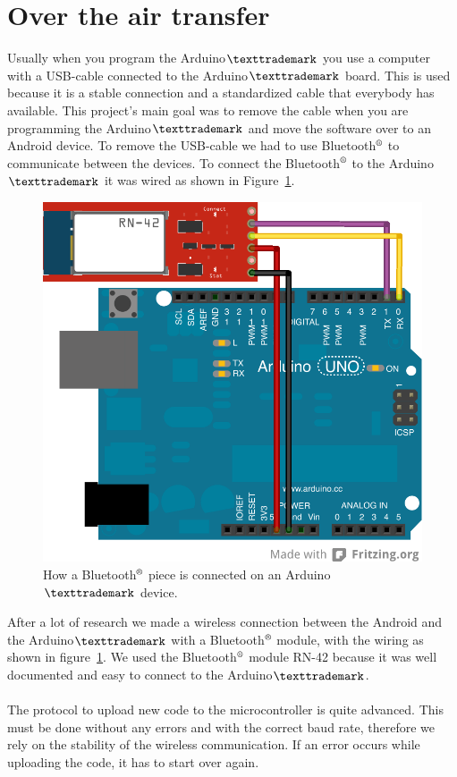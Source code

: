\section{Over the air transfer}
Usually when you program the Arduino$\texttrademark$ you use a computer with a USB-cable connected to the Arduino$\texttrademark$ board. This is used because it is a stable connection and a standardized cable that everybody has available. This project's main goal was to remove the cable when you are programming the Arduino$\texttrademark$ and move the software over to an Android device. To remove the USB-cable we had to use Bluetooth$\textsuperscript{\textregistered}$ to communicate between the devices. To connect the Bluetooth$\textsuperscript{\textregistered}$ to the Arduino$\texttrademark$ it was wired as shown in Figure~\ref{fig:SimpleArduinoWiring}.
\\
\begin{figure}[H]
\centering
\includegraphics[scale=1.2]{images/wiring_simple.png}
\caption[Wiring Diagram for BT module]{How a Bluetooth$\textsuperscript{\textregistered}$ piece is connected on an Arduino$\texttrademark$ device.}
\label{fig:SimpleArduinoWiring}
\end{figure}

After a lot of research we made a wireless connection between the Android and the Arduino$\texttrademark$ with a Bluetooth$\textsuperscript{\textregistered}$ module, with the wiring as shown in figure~\ref{fig:SimpleArduinoWiring}. We used the Bluetooth$\textsuperscript{\textregistered}$ module RN-42 because it was well documented and easy to connect to the Arduino$\texttrademark$.\\
\\
The protocol to upload new code to the microcontroller is quite advanced. This must be done without any errors and with the correct baud rate, therefore we rely on the stability of the wireless communication. If an error occurs while uploading the code, it has to start over again.
